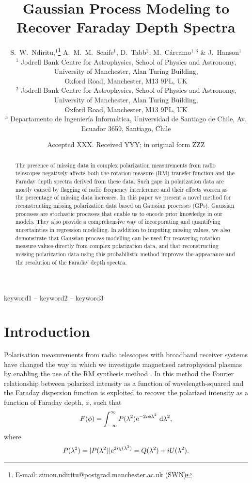 \documentclass[fleqn,usenatbib]{mnras}
\title[GPM for Faraday Depth Spectra]{Gaussian Process Modeling to Recover Faraday Depth Spectra}
\author[S.~W.~Ndiritu et al.]{
S.~W.~Ndiritu,$^{1}$\thanks{E-mail: simon.ndiritu@postgrad.manchester.ac.uk
 (SWN)}
A.~M.~M.~Scaife$^{1}$,
D.~Tabb$^{2}$,
M.~C{\'a}rcamo$^{1,3}$ \&
J.~Hanson$^{1}$ \\
$^{1}$ Jodrell Bank Centre for Astrophysics, School of Physics and Astronomy, University of Manchester, Alan Turing Building,\\ Oxford Road, Manchester, M13 9PL, UK \\
$^{2}$ Jodrell Bank Centre for Astrophysics, School of Physics and Astronomy, University of Manchester, Alan Turing Building,\\ Oxford Road, Manchester, M13 9PL, UK \\
$^{3}$ Departamento de Ingenier\'ia Inform\'atica, Universidad de Santiago de Chile, Av. Ecuador 3659, Santiago, Chile \\
}
\date{Accepted XXX. Received YYY; in original form ZZZ}
\begin{document}
\label{firstpage}
\pagerange{\pageref{firstpage}--\pageref{lastpage}}
\maketitle

\begin{abstract}
The presence of missing data in complex polarization measurements from radio telescopes negatively affects both the rotation measure (RM) transfer function and the Faraday depth spectra derived from these data. Such gaps in polarization data are mostly caused by flagging of radio frequency interference and their effects worsen as the percentage of missing data increases. In this paper we present a novel method for reconstructing missing polarization data based on Gaussian processes (GPs). Gaussian processes are stochastic processes that enable us to encode prior knowledge in our models. They also provide a comprehensive way of incorporating and quantifying uncertainties in regression modelling. In addition to imputing missing values, we also demonstrate that Gaussian process modelling can be used for recovering rotation measure values directly from complex polarization data, and that reconstructing missing polarization data using this probabilistic method improves the appearance and the resolution of the Faraday depth spectra.
\end{abstract}

\begin{keywords}
keyword1 -- keyword2 -- keyword3
\end{keywords}



\section{Introduction}

Polarisation measurements from radio telescopes with broadband receiver systems have changed the way in which we investigate magnetised astrophysical plasmas by enabling the use of the RM synthesis method \citep{1966MNRAS.133...67B, 2005A&A...441.1217B}. In this method the Fourier relationship between polarized intensity as a function of wavelength-squared and the Faraday dispersion function is exploited to recover the polarized intensity as a function of Faraday depth, $\phi$, such that
%
\begin{equation}
\label{eq:fourier}
F(\phi) = \int_{-\infty}^{\infty}{ P(\lambda^2){\rm e}^{-2i\phi \lambda^2}~{\rm d}\lambda^2 },
\end{equation}
%
where
%
\begin{equation}
\label{eq:pol}
P(\lambda^2) = |P(\lambda^2)|{\rm e}^{2i\chi(\lambda^2)} = Q(\lambda^2) + iU(\lambda^2).
\end{equation}
\end{document}
